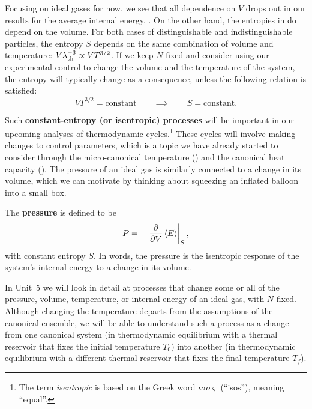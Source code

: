 Focusing on ideal gases for now, we see that all dependence on $V$ drops out in our results for the average internal energy, .
On the other hand, the entropies in  do depend on the volume.
For both cases of distinguishable and indistinguishable particles, the entropy $S$ depends on the same combination of volume and temperature: $V \lambda_{\mathrm{th}}^{-3} \propto V T^{3/2}$.
If we keep $N$ fixed and consider using our experimental control to change the volume and the temperature of the system, the entropy will typically change as a consequence, unless the following relation is satisfied:
\begin{equation*}
  V T^{3/2} = \mbox{constant} \qquad \implies \qquad S = \mbox{constant.}
\end{equation*}

Such \textbf{constant-entropy (or isentropic) processes} will be important in our upcoming analyses of thermodynamic cycles.\footnote{The term \emph{isentropic} is based on the Greek word $\iota\sigma o\varsigma$ (``isos''), meaning ``equal''.}
These cycles will involve making changes to control parameters, which is a topic we have already started to consider through the micro-canonical temperature () and the canonical heat capacity ().
The pressure of an ideal gas is similarly connected to a change in its volume, which we can motivate by thinking about squeezing an inflated balloon into a small box.

\begin{shaded}
  The \textbf{pressure} is defined to be
  \begin{equation}
    \label{eq:pressure}
    P = -\left. \frac{\partial }{\partial V} \left\langle E \right\rangle\right|_S,
  \end{equation}
  with constant entropy $S$.
  In words, the pressure is the isentropic response of the system's internal energy to a change in its volume.
\end{shaded}

In Unit~5 we will look in detail at processes that change some or all of the pressure, volume, temperature, or internal energy of an ideal gas, with $N$ fixed.
Although changing the temperature departs from the assumptions of the canonical ensemble, we will be able to understand such a process as a change from one canonical system (in thermodynamic equilibrium with a thermal reservoir that fixes the initial temperature $T_0$) into another (in thermodynamic equilibrium with a different thermal reservoir that fixes the final temperature $T_f$).


